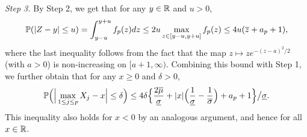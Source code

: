 \documentclass[a4paper,12pt]{article}
\begin{document}
\textit{Step 3.} By Step 2, we get that for any $y \in \mathbb{R}$ and $u > 0$, 
\[ \mathbb{P}( |Z - y| \le u) = \int_{y - u}^{y + u} f_p(z) dz \le 2u \max_{z \in [y-u,y+u]} f_p(z) \le 4u (\overline{z} + a_p + 1), \] 
where the last inequality follows from the fact that the map $z \mapsto z e^{-(z-a)^2/2}$ (with $a > 0$) is non-increasing on $[a+1,\infty)$. Combining this bound with Step 1, we further obtain that for any $x \ge 0$ and $\delta > 0$, 
\begin{equation}\label{eq-bound1-Levy}
\mathbb{P} \Big( \Big| \max_{1 \le j \le p} X_j - x \Big| \le \delta \Big) \le 4\delta \Big\{ \frac{2\overline{\mu}}{\underline{\sigma}} + |x| \Big(\frac{1}{\underline{\sigma}} - \frac{1}{\overline{\sigma}}\Big) + a_p + 1 \Big\} \big/ \underline{\sigma}. 
\end{equation} 
This inequality also holds for $x < 0$ by an analogous argument, and hence for all $x \in \mathbb{R}$. 
\end{document}
